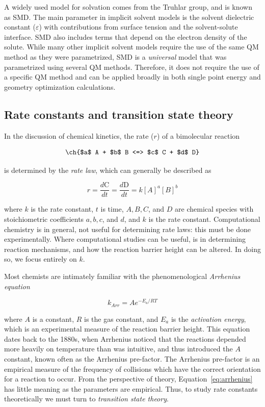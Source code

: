 A widely used model for solvation comes from the Truhlar group, and is known as
SMD.\cite{Marenich2009} The main parameter in implicit solvent models is the
solvent dielectric constant ($\varepsilon$) with contributions from surface
tension and the solvent-solute interface. SMD also includes terms that depend
on the electron density of the solute.  While many other implicit solvent
models require the use of the same QM method as they were
parametrized,\cite{Ho2010} SMD is a \emph{universal} model that was
parametrized using several QM methods. Therefore, it does not require the use
of a specific QM method and can be applied broadly in both single point energy
and geometry optimization calculations.

\subsection{Rate constants and transition state theory}

In the discussion of chemical kinetics, the rate ($r$) of a bimolecular
reaction

\begin{equation}
  \ch{$a$ A + $b$ B <=> $c$ C + $d$ D}
  \label{eq:a}
\end{equation}

\noindent is determined by the \emph{rate law}, which can generally be
described as

\begin{equation}
  r = \frac{d \text{C}}{dt} =\frac{d \text{D}}{dt} = k[A]^a [B]^b
\end{equation}

\noindent where $k$ is the rate constant, $t$ is time, $A, B, C$, and $D$ are
chemical species with stoichiometric coefficients $a, b, c$, and $d$, and $k$
is the rate constant. Computational chemistry is in general, not useful for
determining rate laws: this must be done experimentally. Where computational
studies can be useful, is in determining reaction mechanisms, and how the
reaction barrier height can be altered. In doing so, we focus entirely on $k$.

Most chemists are intimately familiar with the phenomenological \emph{Arrhenius
equation}

\begin{equation}
  k_{Arr} = Ae^{-E_a/RT}
\label{eq:arrhenius}
\end{equation}

\noindent where $A$ is a constant, $R$ is the gas constant, and $E_a$ is the
\emph{activation energy}, which is an experimental measure of the reaction
barrier height. This equation dates back to the 1880s, when Arrhenius noticed
that the reactions depended more heavily on temperature than was intuitive, and
thus introduced the $A$ constant, known often as the Arrhenius
pre-factor.\cite{McQuarrie1997} The Arrhenius pre-factor is an empirical measure
of the frequency of collisions which have the correct orientation for a reaction
to occur. From the perspective of theory, Equation~\ref{eq:arrhenius} has little
meaning as the parameters are empirical. Thus, to study rate constants
theoretically we must turn to \emph{transition state theory}.

